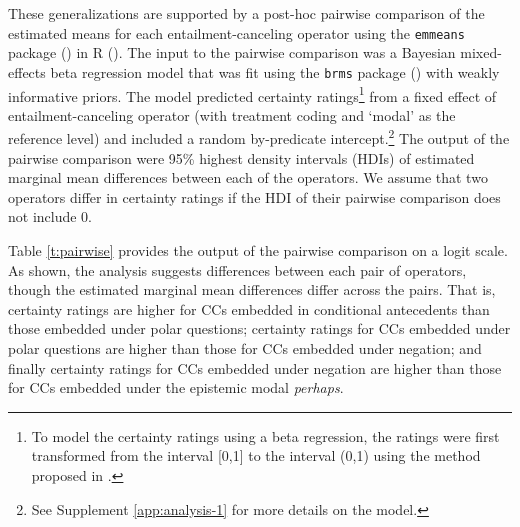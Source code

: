 \documentclass[a4paper,12pt,twoside]{article}
\begin{document}
        These generalizations are supported by a post-hoc pairwise comparison of the estimated means for each entailment-canceling operator using the \texttt{emmeans} package (\citealt{emmeans}) in R (\citealt{r}). The input to the pairwise comparison was a  Bayesian mixed-effects beta regression model that was fit using the \texttt{brms} package (\citealt{buerkner2017}) with weakly informative priors. The model predicted certainty ratings\footnote{To model the certainty ratings using a beta regression, the ratings were first transformed from the interval [0,1] to the interval (0,1) using the method proposed in \citealt{smithson_better_2006}.} from a fixed effect of entailment-canceling operator (with treatment coding and `modal' as the reference level) and included a random by-predicate intercept.\footnote{See Supplement \ref{app:analysis-1} for more details on the model.} The output of the pairwise comparison were 95\% highest density intervals (HDIs) of estimated marginal mean differences between each of the operators. We assume that two operators differ in certainty ratings if the HDI of their pairwise comparison does not include 0. 

        Table \ref{t:pairwise} provides the output of the pairwise comparison on a logit scale.
        As shown, the analysis suggests differences between each pair of operators, though the estimated marginal mean differences differ across the pairs. That is, certainty ratings are higher for CCs embedded in conditional antecedents than those embedded under polar questions; certainty ratings for CCs embedded under polar questions are higher than those for CCs embedded under negation; and finally certainty ratings for CCs embedded under negation are higher than those for CCs embedded under the epistemic modal \emph{perhaps}.
\end{document}
